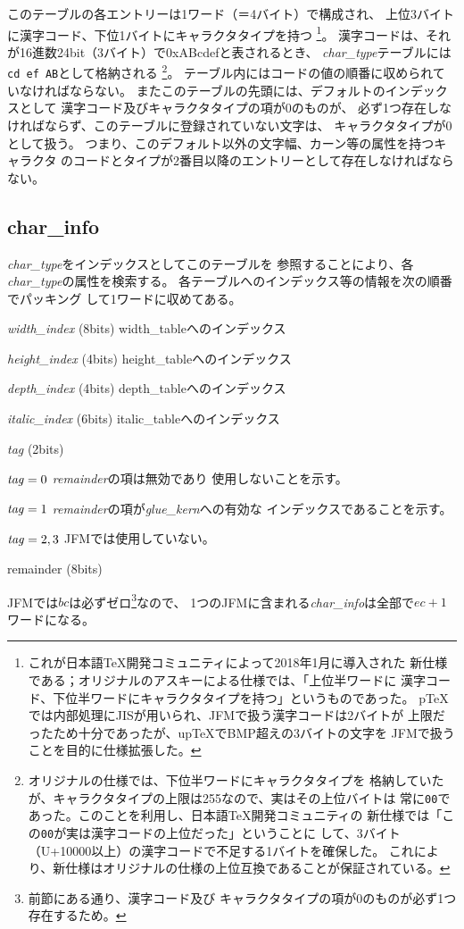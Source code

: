 \documentclass[a4paper,11pt,nomag]{jsarticle}
\begin{document}
このテーブルの各エントリーは1ワード（＝4バイト）で構成され、
上位3バイトに漢字コード、下位1バイトにキャラクタタイプを持つ
\footnote{これが日本語\TeX{}開発コミュニティによって2018年1月に導入された
新仕様である；オリジナルのアスキーによる仕様では、「上位半ワードに
漢字コード、下位半ワードにキャラクタタイプを持つ」というものであった。
p\TeX{}では内部処理にJISが用いられ、JFMで扱う漢字コードは2バイトが
上限だったため十分であったが、up\TeX{}でBMP超えの3バイトの文字を
JFMで扱うことを目的に仕様拡張した。}。
漢字コードは、それが16進数24bit（3バイト）で0xABcdefと表されるとき、
{\it char\_type}テーブルには{\tt cd ef AB}として格納される
\footnote{オリジナルの仕様では、下位半ワードにキャラクタタイプを
格納していたが、キャラクタタイプの上限は255なので、実はその上位バイトは
常に{\tt 00}であった。このことを利用し、日本語\TeX{}開発コミュニティの
新仕様では「この{\tt 00}が実は漢字コードの上位だった」ということに
して、3バイト（U+10000以上）の漢字コードで不足する1バイトを確保した。
これにより、新仕様はオリジナルの仕様の上位互換であることが保証されている。}。
テーブル内にはコードの値の順番に収められていなければならない。
またこのテーブルの先頭には、デフォルトのインデックスとして
漢字コード及びキャラクタタイプの項が0のものが、
必ず1つ存在しなければならず、このテーブルに登録されていない文字は、
キャラクタタイプが0として扱う。
つまり、このデフォルト以外の文字幅、カーン等の属性を持つキャラクタ
のコードとタイプが2番目以降のエントリーとして存在しなければならない。

\subsection{char\_info}
{\it char\_type}をインデックスとしてこのテーブルを
参照することにより、各{\it char\_type}の属性を検索する。
各テーブルへのインデックス等の情報を次の順番でパッキング
して1ワードに収めてある。
\begin{description}
\item{{\it width\_index} (8bits)} width\_tableへのインデックス
\item{{\it height\_index} (4bits)} height\_tableへのインデックス
\item{{\it depth\_index} (4bits)} depth\_tableへのインデックス
\item{{\it italic\_index} (6bits)} italic\_tableへのインデックス
\item{{\it tag} (2bits)}
	\begin{description}
	\item{${\it tag}=0$} {\it remainder}の項は無効であり
		使用しないことを示す。
	\item{${\it tag}=1$} {\it remainder}の項が{\it glue\_kern}への有効な
		インデックスであることを示す。
	\item{${\it tag}=2, 3$} JFMでは使用していない。
	\end{description}
\item{remainder (8bits)}
\end{description}
JFMでは$bc$は必ずゼロ\footnote{前節にある通り、漢字コード及び
キャラクタタイプの項が0のものが必ず1つ存在するため。}なので、
1つのJFMに含まれる{\it char\_info}は全部で$ec+1$ワードになる。
\end{document}
